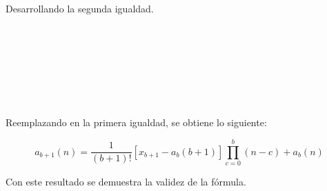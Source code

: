 Desarrollando la segunda igualdad.
\begin{center}
    \begin{derivation}
            \\
        \\
            \\
        \\
            \\
        \\
    \end{derivation}
\end{center}
\vspace*{10pt}
Reemplazando en la primera igualdad, se obtiene lo siguiente:

\[a_{b+1}(n) = \dfrac{1}{(b+1)!}[x_{b+1} - a_b(b+1)]\displaystyle\prod_{c=0}^{b}(n-c) + a_b(n)\]

Con este resultado se demuestra la validez de la fórmula.
